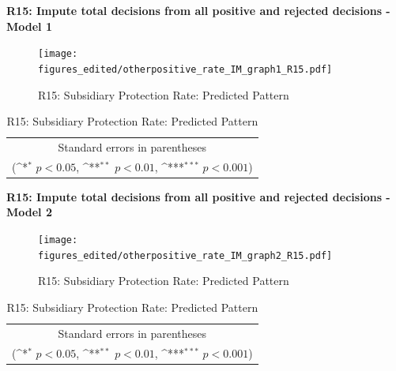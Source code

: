 \documentclass[10pt,a4paper]{scrartcl}
\begin{document}
\clearpage
\textbf{R15: Impute total decisions from all positive and rejected decisions - Model 1}
\begin{figure}[!ht]
	\centering
	\texttt{[image: figures\_edited/otherpositive\_rate\_IM\_graph1\_R15.pdf]}
	\caption{R15: Subsidiary Protection Rate: Predicted Pattern}
\end{figure}

\begin{table}[!ht]\centering
	\renewcommand{\arraystretch}{1.25}
	\def\sym#1{\ifmmode^{#1}\else\(^{#1}\)\fi}
	\caption{R15: Subsidiary Protection Rate: Predicted Pattern}
	\begin{tabular}{l*{2}{c}}
		\hline\hline
		
		\hline\hline
		\multicolumn{3}{c}{\footnotesize Standard errors in parentheses} \\
		\multicolumn{3}{c}{\footnotesize (\sym{*} \(p<0.05\), \sym{**} \(p<0.01\), \sym{***} \(p<0.001\))}\\
	\end{tabular}
\end{table}

\clearpage
\textbf{R15: Impute total decisions from all positive and rejected decisions - Model 2}
\begin{figure}[!ht]
	\centering
	\texttt{[image: figures\_edited/otherpositive\_rate\_IM\_graph2\_R15.pdf]}
	\caption{R15: Subsidiary Protection Rate: Predicted Pattern}
\end{figure}

\begin{table}[!ht]\centering
	\footnotesize
	\renewcommand{\arraystretch}{1.2}
	\def\sym#1{\ifmmode^{#1}\else\(^{#1}\)\fi}
	\caption{R15: Subsidiary Protection Rate: Predicted Pattern}
	\begin{tabular}{l*{2}{c}}
		\hline\hline
		
		\hline\hline
		\multicolumn{3}{c}{\footnotesize Standard errors in parentheses} \\
		\multicolumn{3}{c}{\footnotesize (\sym{*} \(p<0.05\), \sym{**} \(p<0.01\), \sym{***} \(p<0.001\))} \\
	\end{tabular}
\end{table}




\end{document}
